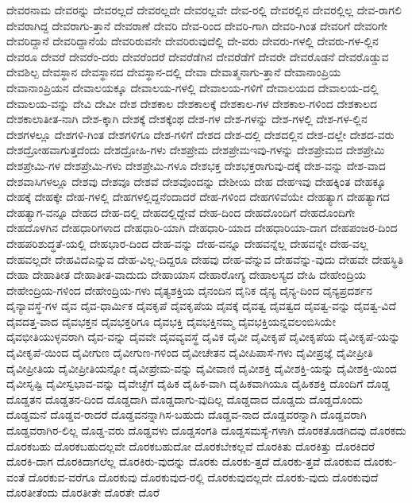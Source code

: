 {ದೇವರನಾಮ
ದೇವರನ್ನು
ದೇವರಲ್ಲದೆ
ದೇವರಲ್ಲದೇ
ದೇವರಲ್ಲವೇ
ದೇವ-ರಲ್ಲಿ
ದೇವರಲ್ಲಿನ
ದೇವರಲ್ಲಿಲ್ಲ
ದೇವ-ರಾಗಲಿ
ದೇವರಾಗಿದ್ದ
ದೇವರಾಗು-ತ್ತಾನೆ
ದೇವರಾಣೆ
ದೇವರಿ
ದೇವ-ರಿಂದ
ದೇವರಿ-ಗಾಗಿ
ದೇವರಿ-ಗಿಂತ
ದೇವರಿಗೆ
ದೇವರಿಗೇ
ದೇವರಿದ್ದಾನೆ
ದೇವರಿದ್ದಾನೆಯೆ
ದೇವರಿರುವನೇ
ದೇವರಿರುವುದೆಲ್ಲಿ
ದೇ-ವರು
ದೇವರು-ಗಳಲ್ಲಿ
ದೇವರು-ಗಳ-ಲ್ಲಿನ
ದೇವರೂ
ದೇವರೆ
ದೇವರೆಂ-ದರು
ದೇವರೆಂದರೆ
ದೇವರೆಡೆಗಿನ
ದೇವರೆಡೆಗೆ
ದೇವರೇ
ದೇವರೊಡನೆ
ದೇವರೊಡ್ಡುವ
ದೇವಶಿಲ್ಪ
ದೇವಸ್ಥಾನ
ದೇವಸ್ಥಾನದ
ದೇವಸ್ಥಾನ-ದಲ್ಲಿ
ದೇವಾ
ದೇವಾತ್ಮನಾಗು-ತ್ತಾನೆ
ದೇವಾನಾಂಪ್ರಿಯ
ದೇವಾನಾಂಪ್ರಿಯನ
ದೇವಾಲಯಕ್ಕೂ
ದೇವಾಲಯ-ಗಳಲ್ಲಿ
ದೇವಾಲಯ-ಗಳಿಗೆ
ದೇವಾಲಯದ
ದೇವಾಲಯ-ದಲ್ಲಿ
ದೇವಾಲಯ-ವನ್ನು
ದೇವಿ
ದೇವೀ
ದೇಶ
ದೇಶಕಾಲ
ದೇಶಕಾಲಕ್ಕೆ
ದೇಶಕಾಲ-ಗಳ
ದೇಶಕಾಲ-ಗಳಿಂದ
ದೇಶಕಾಲದ
ದೇಶಕಾಲಾತೀತ-ನಾಗಿ
ದೇಶ-ಕ್ಕಾಗಿ
ದೇಶಕ್ಕೆ
ದೇಶಕ್ಕೆಂಥ
ದೇಶ-ಗಳ
ದೇಶ-ಗಳನ್ನು
ದೇಶ-ಗಳಲ್ಲಿ
ದೇಶ-ಗಳ-ಲ್ಲಿನ
ದೇಶಗಳಲ್ಲೂ
ದೇಶಗಳಿ-ಗಿಂತ
ದೇಶಗಳಿಗೂ
ದೇಶ-ಗಳಿಗೆ
ದೇಶದ
ದೇಶ-ದಲ್ಲಿ
ದೇಶದಲ್ಲಿನ
ದೇಶ-ದಲ್ಲೇ
ದೇಶದ-ವರು
ದೇಶದ್ರೋಹವಾಗುತ್ತದೆಂದು
ದೇಶದ್ರೋಹಿ-ಗಳು
ದೇಶಪ್ರೇಮ
ದೇಶಪ್ರೇಮಇವು-ಗಳನ್ನು
ದೇಶಪ್ರೇಮದ
ದೇಶಪ್ರೇಮಿ
ದೇಶಪ್ರೇಮಿ-ಗಳ
ದೇಶಪ್ರೇಮಿ-ಗಳು
ದೇಶಪ್ರೇಮಿ-ಗಳೂ
ದೇಶಭಕ್ತ
ದೇಶಭಕ್ತರಾಗುವು-ದಕ್ಕೆ
ದೇಶ-ವನ್ನು
ದೇಶ-ವಾದ
ದೇಶವಾಸಿಗಳಲ್ಲೂ
ದೇಶವು
ದೇಶವೂ
ದೇಶವೆ
ದೇಶವೊಂದನ್ನು
ದೇಶೀಯ
ದೇಹ
ದೇಹಇವು
ದೇಹಕ್ಕಿಂತ
ದೇಹಕ್ಕೂ
ದೇಹಕ್ಕೆ
ದೇಹಕ್ಕೇ
ದೇಹ-ಗಳಲ್ಲಿ
ದೇಹಗಳಲ್ಲಿದ್ದನೆಂದಾದರೆ
ದೇಹ-ಗಳಿಂದ
ದೇಹಗಳಿವೆಯೇ
ದೇಹತ್ಯಾಗ
ದೇಹತ್ಯಾಗದ
ದೇಹತ್ಯಾಗ-ವನ್ನೂ
ದೇಹದ
ದೇಹ-ದಲ್ಲಿ
ದೇಹದಲ್ಲಿದ್ದೇವೆ
ದೇಹ-ದಿಂದ
ದೇಹದೊಂದಿಗೆ
ದೇಹದೊಂದಿಗೇ
ದೇಹದೊಳಗಿನ
ದೇಹಧಾರಿಗಳಾದ
ದೇಹಧಾರಿ-ಯಾಗಿ
ದೇಹಧಾರಿ-ಯಾದ
ದೇಹಧಾರಿಯಾ-ದಾಗ
ದೇಹಪಂಜರ-ದಿಂದ
ದೇಹಪರಿಶುದ್ಧತೆ-ಯಲ್ಲಿ
ದೇಹಭಾರ-ದಿಂದ
ದೇಹ-ವನ್ನು
ದೇಹ-ವನ್ನೂ
ದೇಹವನ್ನೆಲ್ಲ
ದೇಹವನ್ನೇ
ದೇಹ-ವಲ್ಲ
ದೇಹವಲ್ಲದೇ
ದೇಹವಿದೆಎನ್ನುವ
ದೇಹ-ವಿಲ್ಲ-ದಿದ್ದರೂ
ದೇಹವು
ದೇಹ-ವೆನ್ನುವ
ದೇಹವೆನ್ನು-ವುದು
ದೇಹವೇ
ದೇಹಸ್ಥಿತಿ
ದೇಹಾ
ದೇಹಾತೀತ
ದೇಹಾತೀತ-ವಾದುದು
ದೇಹಾಯಾಸ
ದೇಹಾರೋಗ್ಯ
ದೇಹಾಲಸ್ಯದ
ದೇಹಿ
ದೇಹೇಂದ್ರಿಯ
ದೇಹೇಂದ್ರಿಯ-ಗಳಿಂದ
ದೇಹೇಂದ್ರಿಯ-ಗಳು
ದೈತ್ಯಶಕ್ತಿಯ
ದೈನಂದಿನ
ದೈನಿಕ
ದೈನ್ಯ
ದೈನ್ಯ-ದಿಂದ
ದೈನ್ಯಪ್ರದರ್ಶನ
ದೈನ್ಯಾವಸ್ಥೆ-ಗಳ
ದೈವ
ದೈವ-ಧಾರ್ಮಿಕ
ದೈವಕೃಪೆ
ದೈವಕೃಪೆಯ
ದೈವಕ್ಕೆ
ದೈವತ್ವ
ದೈವತ್ವದ
ದೈವತ್ವ-ವನ್ನು
ದೈವತ್ವ-ವಿದೆ
ದೈವದತ್ತ-ವಾದ
ದೈವಭಕ್ತನ
ದೈವಭಕ್ತರಿಗೂ
ದೈವಭಕ್ತಿ
ದೈವಭಕ್ತಿನಮ್ಮ
ದೈವಭಕ್ತಿಯನ್ನವಲಂಬಿಸಿಯೇ
ದೈವಭೀತಿಯುಳ್ಳವರಾಗಿ
ದೈವ-ವನ್ನು
ದೈವವೇ
ದೈವವ್ಯವಸ್ಥೆ
ದೈವಿಕ
ದೈವೀ
ದೈವೀಕೃಪೆ
ದೈವೀಕೃಪೆಯ
ದೈವೀಕೃಪೆ-ಯನ್ನು
ದೈವೀಕೃಪೆ-ಯಿಂದ
ದೈವೀಗುಣ
ದೈವೀಗುಣ-ಗಳಿಂದ
ದೈವೀಚೇತನ
ದೈವೀಪಿಪಾಸೆ-ಗಳು
ದೈವೀಪ್ರಜ್ಞೆ
ದೈವೀಪ್ರೀತಿ
ದೈವೀಪ್ರೀತಿಯ
ದೈವೀಪ್ರೀತಿಯನ್ನೋ
ದೈವೀಪ್ರೇಮ-ವನ್ನು
ದೈವೀವಾಣಿ
ದೈವೀಶಕ್ತಿ
ದೈವೀಶಕ್ತಿ-ಯನ್ನು
ದೈವೀಶಕ್ತಿ-ಯಿಂದ
ದೈವೀಸೃಷ್ಟಿ
ದೈವೀಸ್ವಭಾವ-ವನ್ನು
ದೈವೇಚ್ಛೆಗೆ
ದೈಹಿಕ
ದೈಹಿಕ-ವಾಗಿ
ದೈಹಿಕವಾಗಿಯೂ
ದೈಹಿಕಶಕ್ತಿ
ದೊಂದಿಗೆ
ದೊಡ್ಡ
ದೊಡ್ಡತನ
ದೊಡ್ಡತನ-ದಿಂದ
ದೊಡ್ಡದಾಗಿ
ದೊಡ್ಡದಾಗು-ವುದಿಲ್ಲ
ದೊಡ್ಡದಾದ
ದೊಡ್ಡದು
ದೊಡ್ಡದೊಂದು
ದೊಡ್ಡಮನೆ
ದೊಡ್ಡವ-ರಾದರೆ
ದೊಡ್ಡವನನ್ನಾಗಿಸ-ಬಹುದು
ದೊಡ್ಡವ-ನಾದ
ದೊಡ್ಡವರನ್ನಾಗಿ
ದೊಡ್ಡವರಾಗಿ
ದೊಡ್ಡವರಾಗಿರ-ಲಿಲ್ಲ
ದೊಡ್ಡ-ವರು
ದೊಡ್ಡವಳು
ದೊಡ್ಡಸಂಗತಿ
ದೊಡ್ಡಸಮಸ್ಯೆ-ಗಳಾಗಿ
ದೊರಕತೊಡಗಿದವು
ದೊರಕದು
ದೊರಕಬಹು
ದೊರಕಬಹುದಲ್ಲವೇ
ದೊರಕಬಹುದೋ
ದೊರಕಬೇಕಲ್ಲವೆ
ದೊರಕಿತು
ದೊರಕಿತ್ತು
ದೊರಕಿದರೆ
ದೊರಕಿ-ದಾಗ
ದೊರಕಿದಾಗಲೆಲ್ಲ
ದೊರಕಿರು-ವುದನ್ನು
ದೊರಕು
ದೊರಕು-ತ್ತದೆ
ದೊರಕು-ತ್ತವೆ
ದೊರಕುವ
ದೊರಕು-ವಂತೆ
ದೊರಕುವ-ವರೆಗೂ
ದೊರಕುವು
ದೊರಕುವುದ-ರಲ್ಲಿ
ದೊರಕುವುದಲ್ಲದೇ
ದೊರಕು-ವುದು
ದೊರಕುವುದೆ
ದೊರತೀತೆಂದು
ದೊರತೀತೇ
ದೊರತೇ
ದೊರೆ
}
